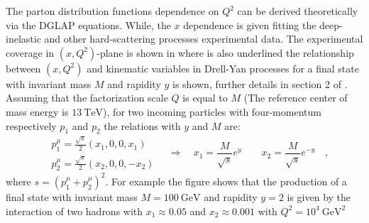 The parton distribution functions dependence on $Q^2$ can be derived theoretically via the DGLAP equations. While, the $x$ dependence is given fitting the deep-inelastic and other hard-scattering processes experimental data.
The experimental coverage in $(x,Q^2)$-plane is shown in  
where is also underlined the relationship between $(x,Q^2)$ and kinematic variables in Drell-Yan processes for a final state with invariant mass $M$ and rapidity $y$ is shown, further details in section 2 of \cite{Campbell2006}. Assuming that the factorization scale $Q$ is equal to $M$ (The reference center of mass energy is $13\ \mathrm{TeV}$), for two incoming particles with four-momentum respectively $p_1$ and $p_2$ the relations with $y$ and $M$ are:  
\begin{equation}
	\begin{aligned}
		&p_1^\mu=\frac{\sqrt{s}}{2}(x_1,0,0,x_1)\\
&p_2^\mu=\frac{\sqrt{s}}{2}(x_2,0,0,-x_2)
	\end{aligned} \quad\Longrightarrow\quad x_1=\frac{M}{\sqrt{s}}e^y\qquad x_2=\frac{M}{\sqrt{s}}e^{-y} \quad ,
\end{equation}
where  $s=(p_1^\mu+p_2^\mu)^2$. For example the figure shows that the production of a final state with invariant mass $M=100\ \mathrm{GeV}$ and rapidity $y=2$ is given by the interaction of two hadrons with $x_1\approx0.05$  and $x_2\approx0.001$ with $Q^2=10^4\ \mathrm{GeV^2}$


